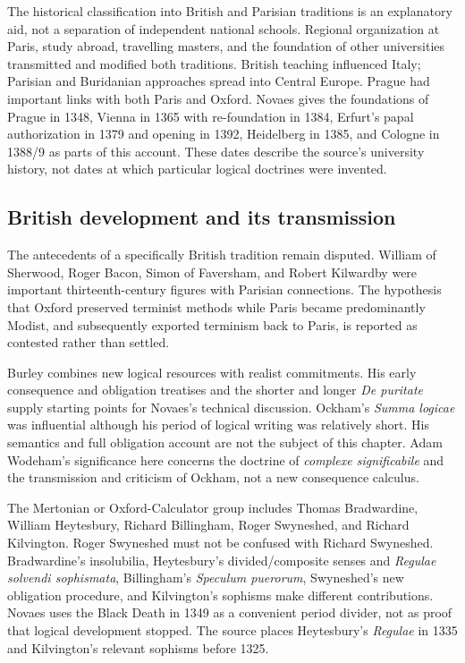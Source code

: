 The historical classification into British and Parisian traditions is an
explanatory aid, not a separation of independent national schools. Regional
organization at Paris, study abroad, travelling masters, and the foundation
of other universities transmitted and modified both traditions.
British teaching influenced Italy; Parisian and Buridanian approaches
spread into Central Europe. Prague had important links with both Paris
and Oxford. Novaes gives the foundations of Prague in 1348, Vienna in 1365
with re-foundation in 1384, Erfurt's papal authorization in 1379 and opening
in 1392, Heidelberg in 1385, and Cologne in 1388/9 as parts of this account.
These dates describe the source's university history, not dates at which
particular logical doctrines were invented.

\subsection{British development and its transmission}

The antecedents of a specifically British tradition remain disputed.
William of Sherwood, Roger Bacon, Simon of Faversham, and Robert Kilwardby
were important thirteenth-century figures with Parisian connections.
The hypothesis that Oxford preserved terminist methods while Paris became
predominantly Modist, and subsequently exported terminism back to Paris,
is reported as contested rather than settled.

Burley combines new logical resources with realist commitments. His early
consequence and obligation treatises and the shorter and longer
\emph{De puritate} supply starting points for Novaes's technical discussion.
Ockham's \emph{Summa logicae} was influential although his period of
logical writing was relatively short. His semantics and full obligation
account are not the subject of this chapter. Adam Wodeham's significance
here concerns the doctrine of \emph{complexe significabile} and the
transmission and criticism of Ockham, not a new consequence calculus.

The Mertonian or Oxford-Calculator group includes Thomas Bradwardine,
William Heytesbury, Richard Billingham, Roger Swyneshed, and Richard
Kilvington. Roger Swyneshed must not be confused with Richard Swyneshed.
Bradwardine's insolubilia, Heytesbury's divided/composite senses and
\emph{Regulae solvendi sophismata}, Billingham's \emph{Speculum puerorum},
Swyneshed's new obligation procedure, and Kilvington's sophisms make
different contributions. Novaes uses the Black Death in 1349 as a
convenient period divider, not as proof that logical development stopped.
The source places Heytesbury's \emph{Regulae} in 1335 and Kilvington's
relevant sophisms before 1325.

